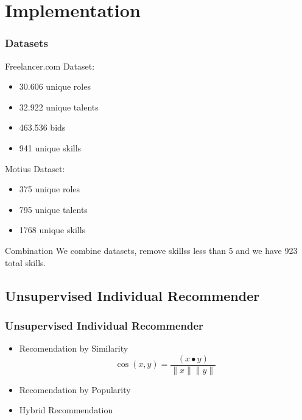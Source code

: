 \documentclass{beamer}
\begin{document}



\section{Implementation} 
\begin{frame}
\frametitle{Datasets}
	Freelancer.com Dataset:
\begin{itemize}
	\item 30.606 unique roles
	\item 32.922 unique talents
	\item 463.536 bids
	\item 941 unique skills
\end{itemize} 
	Motius Dataset:
\begin{itemize}
	\item 375 unique roles
	\item 795 unique talents
	\item 1768 unique skills
\end{itemize} 

   \begin{block}{Combination}
	We combine datasets, remove skillss less than 5 and we have 923 total skills. 
\end{block}

\end{frame}


\subsection{Unsupervised Individual Recommender} 
\begin{frame}
\frametitle{Unsupervised Individual Recommender}
   \begin{itemize}
	\item Recomendation by Similarity
	\begin{equation}
	\cos (x, y)=\frac{(x \bullet y)}{\|x\|\|y\|}
	\end{equation}
	\item Recomendation by Popularity
	\item Hybrid Recommendation
\end{itemize} 
\end{frame}
\end{document}
